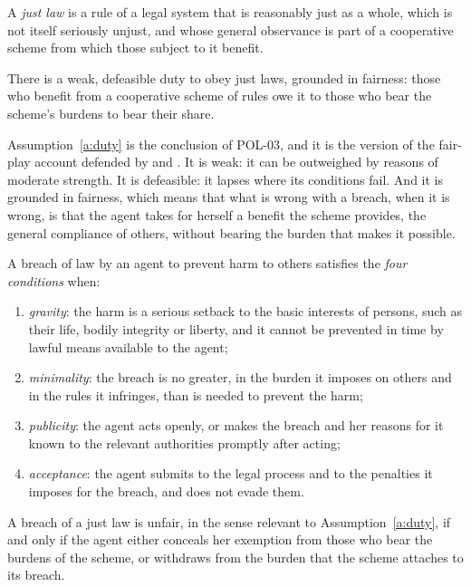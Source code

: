 \documentclass{situationist-preprint}
\begin{document}
\begin{definition}\label{d:just}
A \emph{just law} is a rule of a legal system that is reasonably just as a whole, which is not itself seriously unjust, and whose general observance is part of a cooperative scheme from which those subject to it benefit.
\end{definition}

\begin{assumption}\label{a:duty}
There is a weak, defeasible duty to obey just laws, grounded in fairness: those who benefit from a cooperative scheme of rules owe it to those who bear the scheme's burdens to bear their share.
\end{assumption}

Assumption~\ref{a:duty} is the conclusion of POL-03, and it is the version of the fair-play account defended by \citet{Hart1955} and \citet{Rawls1964}. It is weak: it can be outweighed by reasons of moderate strength. It is defeasible: it lapses where its conditions fail. And it is grounded in fairness, which means that what is wrong with a breach, when it is wrong, is that the agent takes for herself a benefit the scheme provides, the general compliance of others, without bearing the burden that makes it possible.

\begin{definition}\label{d:conditions}
A breach of law by an agent to prevent harm to others satisfies the \emph{four conditions} when:
\begin{enumerate}[label=(\roman*)]
\item \emph{gravity}: the harm is a serious setback to the basic interests of persons, such as their life, bodily integrity or liberty, and it cannot be prevented in time by lawful means available to the agent;
\item \emph{minimality}: the breach is no greater, in the burden it imposes on others and in the rules it infringes, than is needed to prevent the harm;
\item \emph{publicity}: the agent acts openly, or makes the breach and her reasons for it known to the relevant authorities promptly after acting;
\item \emph{acceptance}: the agent submits to the legal process and to the penalties it imposes for the breach, and does not evade them.
\end{enumerate}
\end{definition}

\begin{principle}\label{p:freeride}
A breach of a just law is unfair, in the sense relevant to Assumption~\ref{a:duty}, if and only if the agent either conceals her exemption from those who bear the burdens of the scheme, or withdraws from the burden that the scheme attaches to its breach.
\end{principle}
\end{document}
